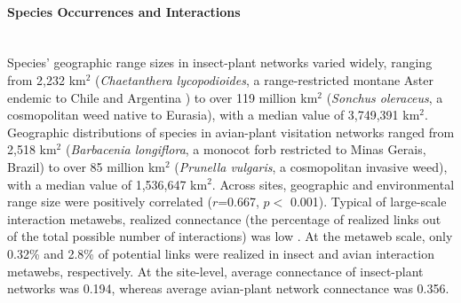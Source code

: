 \paragraph*{Species Occurrences and Interactions}\mbox{}\\ 
Species' geographic range sizes in insect-plant networks varied widely, ranging from 2,232 km$^2$ (\textit{Chaetanthera lycopodioides}, a range-restricted montane Aster endemic to Chile and Argentina \cite{arroyo2007display}) to over 119 million km$^2$ (\textit{Sonchus oleraceus}, a cosmopolitan weed native to Eurasia), with a median value of 3,749,391 km$^2$. Geographic distributions of species in avian-plant visitation networks ranged from 2,518 km$^2$ (\textit{Barbacenia longiflora}, a monocot forb restricted to Minas Gerais, Brazil) to over 85 million km$^2$ (\textit{Prunella vulgaris}, a cosmopolitan invasive weed), with a median value of 1,536,647 km$^2$. Across sites, geographic and environmental range size were positively correlated ($r$=0.667, $p <$ 0.001). Typical of large-scale interaction metawebs, realized connectance (the percentage of realized links out of the total possible number of interactions) was low \parencite{jordano1987patterns}. At the metaweb scale, only 0.32\% and 2.8\% of potential links were realized in insect and avian interaction metawebs, respectively. At the site-level, average connectance of insect-plant networks was 0.194, whereas average avian-plant network connectance was 0.356. 




